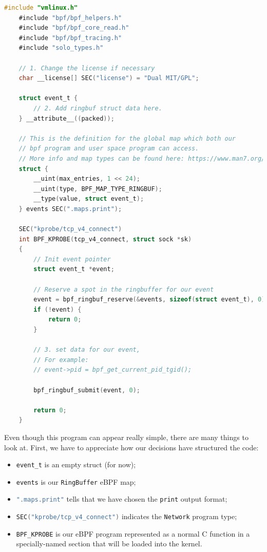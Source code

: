 \begin{lstlisting}[style=cstyle, language=C, caption={bee first program}]
	#include "vmlinux.h"
	#include "bpf/bpf_helpers.h"
	#include "bpf/bpf_core_read.h"
	#include "bpf/bpf_tracing.h"
	#include "solo_types.h"
	
	// 1. Change the license if necessary 
	char __license[] SEC("license") = "Dual MIT/GPL";
	
	struct event_t {
		// 2. Add ringbuf struct data here.
	} __attribute__((packed));
	
	// This is the definition for the global map which both our
	// bpf program and user space program can access.
	// More info and map types can be found here: https://www.man7.org/linux/man-pages/man2/bpf.2.html
	struct {
		__uint(max_entries, 1 << 24);
		__uint(type, BPF_MAP_TYPE_RINGBUF);
		__type(value, struct event_t);
	} events SEC(".maps.print");
	
	SEC("kprobe/tcp_v4_connect")
	int BPF_KPROBE(tcp_v4_connect, struct sock *sk)
	{
		// Init event pointer
		struct event_t *event;
		
		// Reserve a spot in the ringbuffer for our event
		event = bpf_ringbuf_reserve(&events, sizeof(struct event_t), 0);
		if (!event) {
			return 0;
		}
		
		// 3. set data for our event,
		// For example:
		// event->pid = bpf_get_current_pid_tgid();
		
		bpf_ringbuf_submit(event, 0);
		
		return 0;
	}
\end{lstlisting}

Even though this program can appear really simple, there are many things to look at.
First, we have to appreciate how our decisions have structured the code:

\begin{itemize}
	\item 
		\colorbox{backcolour}{\lstinline[style=cstyle, language=C]|event_t|} is an empty struct (for now);
	\item 
		\colorbox{backcolour}{\lstinline[style=cstyle, language=C]|events|} is our \colorbox{backcolour}{\lstinline[style=highlight, language=bash]|RingBuffer|} eBPF map;
	\item 
		\colorbox{backcolour}{\lstinline[style=cstyle, language=C]|".maps.print"|} tells that we have chosen the \colorbox{backcolour}{\lstinline[style=highlight, language=bash]|print|} output format;
	\item 
		\colorbox{backcolour}{\lstinline[style=cstyle, language=C]|SEC("kprobe/tcp_v4_connect")|} indicates the \colorbox{backcolour}{\lstinline[style=highlight, language=bash]|Network|} program type;
	\item 
		\colorbox{backcolour}{\lstinline[style=cstyle, language=C]|BPF_KPROBE|} is our eBPF program represented as a normal C function in a specially-named section that will be loaded into the kernel.
\end{itemize}

